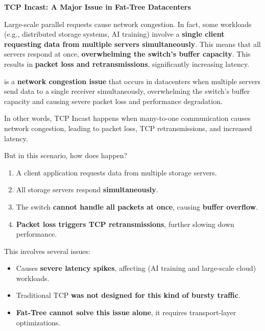 \highspace
\begin{flushleft}
    \textcolor{Red2}{ \textbf{TCP Incast: A Major Issue in Fat-Tree Datacenters}}
\end{flushleft}
Large-scale parallel requests cause network congestion. In fact, some workloads (e.g., distributed storage systems, AI training) involve a \textbf{single client requesting data from multiple servers simultaneously}. This means that all servers respond at once, \textbf{overwhelming the switch's buffer capacity}. This results in \textbf{packet loss and retransmissions}, significantly increasing latency.

\begin{definitionbox}
     is a \textbf{network congestion issue} that occurs in datacenters when multiple servers send data to a single receiver simultaneously, overwhelming the switch's buffer capacity and causing severe packet loss and performance degradation.

    In other words, TCP Incast happens when many-to-one communication causes network congestion, leading to packet loss, TCP retransmissions, and increased latency.
\end{definitionbox}

\highspace
But in this scenario, how does  happen?
\begin{enumerate}
    \item A client application requests data from multiple storage servers.
    \item All storage servers respond \textbf{simultaneously}.
    \item The switch \textbf{cannot handle all packets at once}, causing \textbf{buffer overflow}.
    \item \textbf{Packet loss triggers TCP retransmissions}, further slowing down performance.
\end{enumerate}
This involves several issues:
\begin{itemize}
    \item Causes \textbf{severe latency spikes}, affecting (AI training and large-scale cloud) workloads.
    \item Traditional TCP \textbf{was not designed for this kind of bursty traffic}.
    \item \textbf{Fat-Tree cannot solve this issue alone}, it requires transport-layer optimizations.
\end{itemize}

